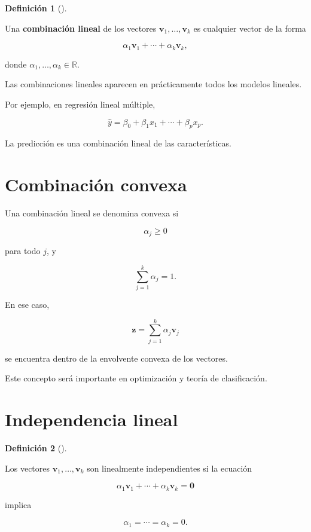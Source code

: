 \documentclass[
  spanish,
  10.5pt,
  letterpaper,
  DIV=11,
  numbers=noendperiod,
  oneside,
  open=any]{scrreprt}
\theoremstyle{definition}
\newtheorem{definition}{Definición}[chapter]
\theoremstyle{definition}
\theoremstyle{plain}
\theoremstyle{remark}
\begin{document}

\begin{definition}[]\protect\hypertarget{def-combinacion-lineal}{}\label{def-combinacion-lineal}

Una \textbf{combinación lineal} de los vectores
\(\mathbf{v}_1,\ldots,\mathbf{v}_k\) es cualquier vector de la forma

\[
\alpha_1\mathbf{v}_1+\cdots+\alpha_k\mathbf{v}_k,
\]

donde \(\alpha_1,\ldots,\alpha_k\in\mathbb{R}\).

\end{definition}

Las combinaciones lineales aparecen en prácticamente todos los modelos
lineales.

Por ejemplo, en regresión lineal múltiple,

\[
\widehat{y}
=
\beta_0
+
\beta_1x_1
+
\cdots
+
\beta_px_p.
\]

La predicción es una combinación lineal de las características.

\section*{Combinación convexa}\label{combinaciuxf3n-convexa}


Una combinación lineal se denomina convexa si

\[
\alpha_j\geq 0
\]

para todo \(j\), y

\[
\sum_{j=1}^{k}\alpha_j=1.
\]

En ese caso,

\[
\mathbf{z}
=
\sum_{j=1}^{k}
\alpha_j\mathbf{v}_j
\]

se encuentra dentro de la envolvente convexa de los vectores.

Este concepto será importante en optimización y teoría de clasificación.

\section*{Independencia lineal}\label{independencia-lineal}


\begin{definition}[]\protect\hypertarget{def-independencia-lineal}{}\label{def-independencia-lineal}

Los vectores \(\mathbf{v}_1,\ldots,\mathbf{v}_k\) son linealmente
independientes si la ecuación

\[
\alpha_1\mathbf{v}_1+\cdots+\alpha_k\mathbf{v}_k
=
\mathbf{0}
\]

implica

\[
\alpha_1=\cdots=\alpha_k=0.
\]

\end{definition}
\end{document}
